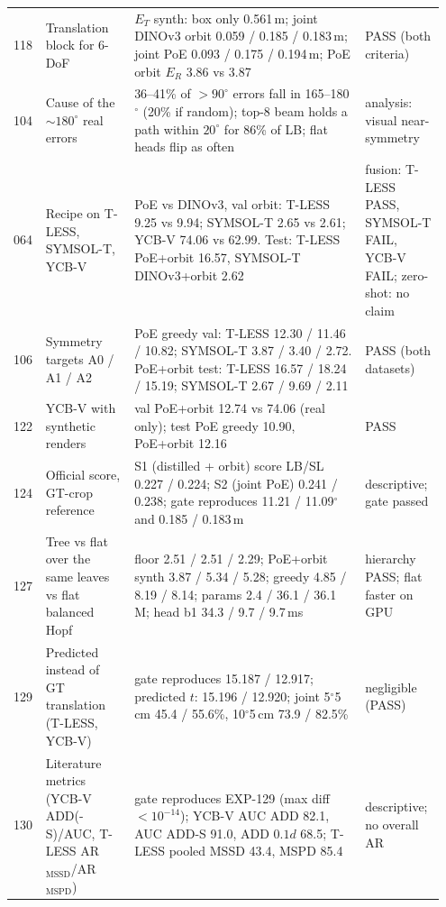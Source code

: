 \begin{table}[t]
\begin{tabular}{@{}p{0.05\linewidth}p{0.2\linewidth}p{0.52\linewidth}p{0.18\linewidth}@{}}
    \raggedright 118 & \raggedright Translation block for 6-DoF & \raggedright $E_T$ synth: box only 0.561\,m; joint DINOv3 orbit 0.059 / 0.185 / 0.183\,m; joint PoE 0.093 / 0.175 / 0.194\,m; PoE orbit $E_R$ 3.86 vs 3.87 & \raggedright PASS (both criteria)\tabularnewline
    \raggedright 104 & \raggedright Cause of the $\sim180^\circ$ real errors & \raggedright 36--41\% of $>90^\circ$ errors fall in 165--180$^\circ$ (20\% if random); top-8 beam holds a path within $20^\circ$ for 86\% of LB; flat heads flip as often & \raggedright analysis: visual near-symmetry\tabularnewline
    \raggedright 064 & \raggedright Recipe on T-LESS, SYMSOL-T, YCB-V & \raggedright PoE vs DINOv3, val orbit: T-LESS 9.25 vs 9.94; SYMSOL-T 2.65 vs 2.61; YCB-V 74.06 vs 62.99. Test: T-LESS PoE+orbit 16.57, SYMSOL-T DINOv3+orbit 2.62 & \raggedright fusion: T-LESS PASS, SYMSOL-T FAIL, YCB-V FAIL; zero-shot: no claim\tabularnewline
    \raggedright 106 & \raggedright Symmetry targets A0 / A1 / A2 & \raggedright PoE greedy val: T-LESS 12.30 / 11.46 / 10.82; SYMSOL-T 3.87 / 3.40 / 2.72. PoE+orbit test: T-LESS 16.57 / 18.24 / 15.19; SYMSOL-T 2.67 / 9.69 / 2.11 & \raggedright PASS (both datasets)\tabularnewline
    \raggedright 122 & \raggedright YCB-V with synthetic renders & \raggedright val PoE+orbit 12.74 vs 74.06 (real only); test PoE greedy 10.90, PoE+orbit 12.16 & \raggedright PASS\tabularnewline
    \raggedright 124 & \raggedright Official score, GT-crop reference & \raggedright S1 (distilled + orbit) score LB/SL 0.227 / 0.224; S2 (joint PoE) 0.241 / 0.238; gate reproduces 11.21 / 11.09$^\circ$ and 0.185 / 0.183\,m & \raggedright descriptive; gate passed\tabularnewline
    \raggedright 127 & \raggedright Tree vs flat over the same leaves vs flat balanced Hopf & \raggedright floor 2.51 / 2.51 / 2.29; PoE+orbit synth 3.87 / 5.34 / 5.28; greedy 4.85 / 8.19 / 8.14; params 2.4 / 36.1 / 36.1\,M; head b1 34.3 / 9.7 / 9.7\,ms & \raggedright hierarchy PASS; flat faster on GPU\tabularnewline
    \raggedright 129 & \raggedright Predicted instead of GT translation (T-LESS, YCB-V) & \raggedright gate reproduces 15.187 / 12.917; predicted $t$: 15.196 / 12.920; joint 5$^\circ$5\,cm 45.4 / 55.6\%, 10$^\circ$5\,cm 73.9 / 82.5\% & \raggedright negligible (PASS)\tabularnewline
    \raggedright 130 & \raggedright Literature metrics (YCB-V ADD(-S)/AUC, T-LESS AR$_\text{MSSD}$/AR$_\text{MSPD}$) & \raggedright gate reproduces EXP-129 (max diff $<10^{-14}$); YCB-V AUC ADD 82.1, AUC ADD-S 91.0, ADD $0.1d$ 68.5; T-LESS pooled MSSD 43.4, MSPD 85.4 & \raggedright descriptive; no overall AR\tabularnewline
    \bottomrule
  \end{tabular}
\end{table}
